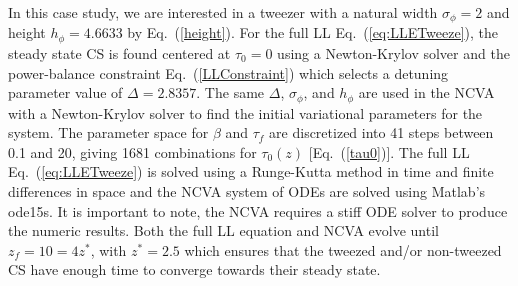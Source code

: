\documentclass[aps,floatfix,showpacs,preprintnumbers,twocolumn,nofootinbib]{revtex4}
\begin{document}

In this case study, we are interested in a tweezer with a natural width $\sigma_\phi = 2$ and height $h_\phi = 4.6633$ by Eq.~(\ref{height}). 
%
For the full LL Eq.~(\ref{eq:LLETweeze}), the steady state CS is found centered at $\tau_0 = 0$ using a Newton-Krylov solver and the power-balance constraint Eq.~(\ref{LLConstraint}) which selects a detuning parameter value of $\Delta =  2.8357$.
%
The same $\Delta$, $\sigma_\phi$, and $h_\phi$ are used in the NCVA with a Newton-Krylov solver to find the initial variational parameters for the system.  
%
The parameter space for $\beta$ and $\tau_f$ are discretized into 41 steps between 0.1 and 20, giving 1681 combinations for $\tau_0(z)$ [Eq.~(\ref{tau0})].  
%
The full LL Eq.~(\ref{eq:LLETweeze}) is solved using a Runge-Kutta method in time and finite differences in space and the NCVA system of ODEs are solved using Matlab's ode15s.  It is important to note, the NCVA requires a stiff ODE solver to produce the numeric results. 
%
Both the full LL equation and NCVA evolve until $z_f = 10 = 4z^*$, with $z^* = 2.5$ which ensures that the tweezed and/or non-tweezed CS have enough time to converge towards their steady state. 
\end{document}
